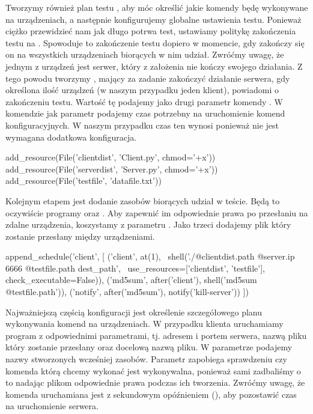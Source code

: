 \documentclass[00-praca-magisterska.tex]{subfiles}
\begin{document}
Tworzymy również plan testu , aby móc określić jakie
komendy będę wykonywane na urządzeniach, a następnie konfigurujemy globalne
ustawienia testu. Ponieważ ciężko przewidzieć nam jak długo potrwa test,
ustawiamy politykę zakończenia testu na . Spowoduje to
zakończenie testu dopiero w momencie, gdy zakończy się on na wszystkich
urządzeniach biorących w nim udział. Zwróćmy uwagę, że jednym z urządzeń jest
serwer, który z założenia nie kończy swojego działania. Z tego powodu tworzymy
, mający za zadanie zakończyć działanie serwera, gdy określona
ilość urządzeń (w naszym przypadku jeden klient), powiadomi o zakończeniu
testu. Wartość tę podajemy jako drugi parametr komendy .
W komendzie  jak parametr 
podajemy czas potrzebny na uruchomienie komend konfiguracyjnych. W naszym
przypadku czas ten wynosi  ponieważ nie jest wymagana dodatkowa
konfiguracja.

\begin{pythoncode}
  add_resource(File('clientdist', 'Client.py', chmod='+x'))
  add_resource(File('serverdist', 'Server.py', chmod='+x'))
  add_resource(File('testfile', 'datafile.txt'))
\end{pythoncode}

Kolejnym etapem jest dodanie zasobów biorących udział w teście. Będą to
oczywiście programy  oraz . Aby zapewnić im
odpowiednie prawa po przesłaniu na zdalne urządzenia, koszystamy z parametru
. Jako trzeci dodajemy plik który zostanie przesłany między
urządzeniami.

\begin{pythoncode}
  append_schedule('client', [
      ('client', at(1), \
          shell('./@{clientdist.path} @{server.ip} 6666 @{testfile.path} dest_path', \
	  use_resources=['clientdist', 'testfile'], check_executable=False)),
      ('md5sum', after('client'), shell('md5sum @{testfile.path}')),
      ('notify', after('md5sum'), notify('kill-server'))
  ])
\end{pythoncode}

Najważniejszą częścią konfiguracji jest określenie szczegółowego planu
wykonywania komend na urządzeniach. W przypadku klienta uruchamiamy program
\code{Client.py} z odpowiednimi parametrami, tj. adresem i portem serwera, nazwą
pliku który zostanie przesłany oraz docelową nazwą pliku. W parametrze
\code{use\_resources} podajemy nazwy stworzonych wcześniej zasobów. Parametr
\code{check\_executable=False} zapobiega sprawdzeniu czy komenda którą chcemy
wykonać jest wykonywalna, ponieważ sami zadbaliśmy o to nadając plikom
odpowiednie prawa podczas ich tworzenia. Zwróćmy uwagę, że komenda 
uruchamiana jest z sekundowym opóźnieniem (\code{at(1)}), aby pozostawić czas na
uruchomienie serwera.
\end{document}
